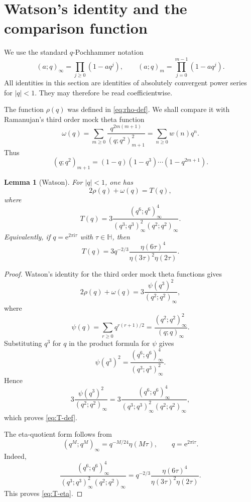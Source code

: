 \documentclass[10pt,a4paper]{amsart}
\newtheorem{lemma}[theorem]{Lemma}
\newcommand{\ii}{\mathrm i}
\newcommand{\e}{\mathrm e}
\newcommand{\Hh}{\mathbb H}
\begin{document}
\section{Watson's identity and the comparison function}\label{sec:watson}

We use the standard $q$-Pochhammer notation
\[
(a;q)_\infty=\prod_{j\geq0}(1-aq^j),
\qquad
(a;q)_m=\prod_{j=0}^{m-1}(1-aq^j).
\]
All identities in this section are identities of absolutely convergent power series for $|q|<1$.
They may therefore be read coefficientwise.

The function $\rho(q)$ was defined in \eqref{eq:rho-def}. We shall compare it with Ramanujan's third order mock theta function
\begin{equation}\label{eq:omega-def}
\omega(q)
=
\sum_{m\geq0}\frac{q^{2m(m+1)}}{(q;q^2)_{m+1}^2}
=
\sum_{n\geq0}w(n)q^n.
\end{equation}
Thus
\[
(q;q^2)_{m+1}
=
(1-q)(1-q^3)\cdots(1-q^{2m+1}).
\]

\begin{lemma}[Watson]\label{lem:watson}
For $|q|<1$, one has
\begin{equation}\label{eq:watson}
2\rho(q)+\omega(q)=T(q),
\end{equation}
where
\begin{equation}\label{eq:T-def}
T(q)=3\frac{(q^6;q^6)_\infty^4}{(q^3;q^3)_\infty^2(q^2;q^2)_\infty}.
\end{equation}
Equivalently, if $q=\e^{2\pi\ii\tau}$ with $\tau\in\Hh$, then
\begin{equation}\label{eq:T-eta}
T(q)=3q^{-2/3}\frac{\eta(6\tau)^4}{\eta(3\tau)^2\eta(2\tau)}.
\end{equation}
\end{lemma}

\begin{proof}
Watson's identity for the third order mock theta functions gives \cite{Watson}
\[
2\rho(q)+\omega(q)
=
3\frac{\psi(q^3)^2}{(q^2;q^2)_\infty},
\]
where
\[
\psi(q)=\sum_{r\geq0}q^{r(r+1)/2}
=
\frac{(q^2;q^2)_\infty^2}{(q;q)_\infty}.
\]
Substituting $q^3$ for $q$ in the product formula for $\psi$ gives
\[
\psi(q^3)^2
=
\frac{(q^6;q^6)_\infty^4}{(q^3;q^3)_\infty^2}.
\]
Hence
\[
3\frac{\psi(q^3)^2}{(q^2;q^2)_\infty}
=
3\frac{(q^6;q^6)_\infty^4}{(q^3;q^3)_\infty^2(q^2;q^2)_\infty},
\]
which proves \eqref{eq:T-def}.

The eta-quotient form follows from
\[
(q^M;q^M)_\infty=q^{-M/24}\eta(M\tau),
\qquad q=\e^{2\pi\ii\tau}.
\]
Indeed,
\[
\frac{(q^6;q^6)_\infty^4}{(q^3;q^3)_\infty^2(q^2;q^2)_\infty}
=
q^{-2/3}\frac{\eta(6\tau)^4}{\eta(3\tau)^2\eta(2\tau)}.
\]
This proves \eqref{eq:T-eta}.
\end{proof}
\end{document}
